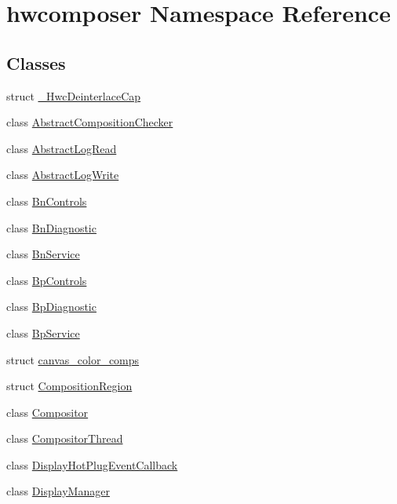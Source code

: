 \hypertarget{namespacehwcomposer}{}\section{hwcomposer Namespace Reference}
\label{namespacehwcomposer}
\subsection*{Classes}
\begin{DoxyCompactItemize}
\item 
struct \mbox{\hyperlink{structhwcomposer_1_1__HwcDeinterlaceCap}{\+\_\+\+Hwc\+Deinterlace\+Cap}}
\item 
class \mbox{\hyperlink{classhwcomposer_1_1AbstractCompositionChecker}{Abstract\+Composition\+Checker}}
\item 
class \mbox{\hyperlink{classhwcomposer_1_1AbstractLogRead}{Abstract\+Log\+Read}}
\item 
class \mbox{\hyperlink{classhwcomposer_1_1AbstractLogWrite}{Abstract\+Log\+Write}}
\item 
class \mbox{\hyperlink{classhwcomposer_1_1BnControls}{Bn\+Controls}}
\item 
class \mbox{\hyperlink{classhwcomposer_1_1BnDiagnostic}{Bn\+Diagnostic}}
\item 
class \mbox{\hyperlink{classhwcomposer_1_1BnService}{Bn\+Service}}
\item 
class \mbox{\hyperlink{classhwcomposer_1_1BpControls}{Bp\+Controls}}
\item 
class \mbox{\hyperlink{classhwcomposer_1_1BpDiagnostic}{Bp\+Diagnostic}}
\item 
class \mbox{\hyperlink{classhwcomposer_1_1BpService}{Bp\+Service}}
\item 
struct \mbox{\hyperlink{structhwcomposer_1_1canvas__color__comps}{canvas\+\_\+color\+\_\+comps}}
\item 
struct \mbox{\hyperlink{structhwcomposer_1_1CompositionRegion}{Composition\+Region}}
\item 
class \mbox{\hyperlink{classhwcomposer_1_1Compositor}{Compositor}}
\item 
class \mbox{\hyperlink{classhwcomposer_1_1CompositorThread}{Compositor\+Thread}}
\item 
class \mbox{\hyperlink{classhwcomposer_1_1DisplayHotPlugEventCallback}{Display\+Hot\+Plug\+Event\+Callback}}
\item 
class \mbox{\hyperlink{classhwcomposer_1_1DisplayManager}{Display\+Manager}}
\item 

\end{DoxyCompactItemize}
